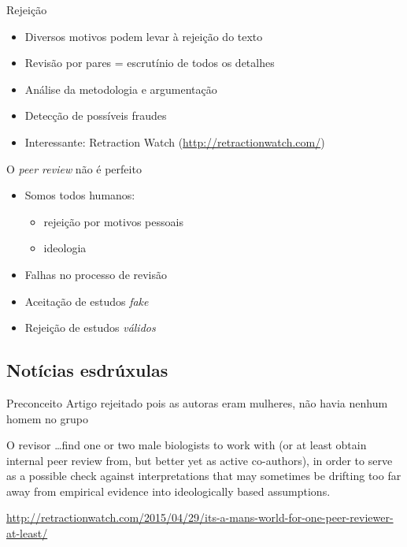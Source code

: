 \documentclass{beamer}
\begin{document}
\begin{frame}{Rejeição}
  \begin{itemize}
  \item Diversos motivos podem levar à rejeição do texto
  \item Revisão por pares = escrutínio de todos os detalhes
  \item Análise da metodologia e argumentação
  \item Detecção de possíveis fraudes
  \item Interessante: Retraction Watch (\url{http://retractionwatch.com/})
  \end{itemize}
\end{frame}

\begin{frame}{O {\em peer review} não é perfeito}
  \begin{itemize}
  \item Somos todos humanos:
    \begin{itemize}
    \item rejeição por motivos pessoais
    \item ideologia
    \end{itemize}
  \item Falhas no processo de revisão
  \item Aceitação de estudos {\em fake}
  \item Rejeição de estudos {\em válidos}
  \end{itemize}
\end{frame}

\subsection{Notícias esdrúxulas}

\begin{frame}{Preconceito}
  Artigo rejeitado pois as autoras eram mulheres, não havia nenhum
  homem no grupo
    \begin{block}{O revisor}
      \ldots find one or two male biologists to work with (or at least
      obtain internal peer review from, but better yet as active
      co-authors), in order to serve as a possible check against
      interpretations that may sometimes be drifting too far away from
      empirical evidence into ideologically based assumptions.
    \end{block}

\url{http://retractionwatch.com/2015/04/29/its-a-mans-world-for-one-peer-reviewer-at-least/}
\end{frame}
\end{document}
